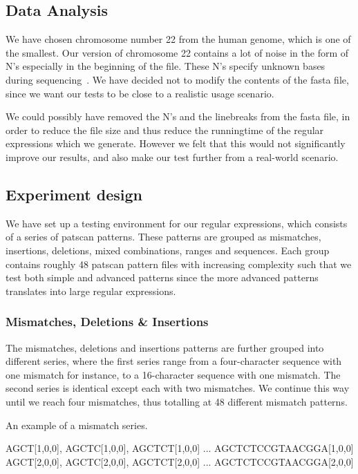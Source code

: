 \documentclass[12pt]{article}
\theoremstyle{definition}
\begin{document}
\subsection{Data Analysis}

We have chosen chromosome number 22 from the human genome, which is one of the smallest. Our version of chromosome 22 contains a lot of noise in the form of N's especially in the beginning of the file. These N's specify unknown bases during sequencing~\cite{human-genome}. We have decided not to modify the contents of the fasta file, since we want our tests to be close to a realistic usage scenario.

We could possibly have removed the N's and the linebreaks from the fasta file, in order to reduce the file size and thus reduce the runningtime of the regular expressions which we generate. However we felt that this would not significantly improve our results, and also make our test further from a real-world scenario.

\subsection{Experiment design}

We have set up a testing environment for our regular expressions, which consists of a series of patscan patterns. These patterns are grouped as mismatches, insertions, deletions, mixed combinations, ranges and sequences. Each group contains roughly 48 patscan pattern files with increasing complexity such that we test both simple and advanced patterns since the more advanced patterns translates into large regular expressions. 

\subsubsection{Mismatches, Deletions \& Insertions}
The mismatches, deletions and insertions patterns are further grouped into different series, where the first series range from a four-character sequence with one mismatch for instance, to a 16-character sequence with one mismatch. The second series is identical except each with two mismatches. We continue this way until we reach four mismatches, thus totalling at 48 different mismatch patterns.

\begin{example}
An example of a mismatch series.

\begin{center}
AGCT[1,0,0], AGCTC[1,0,0], AGCTCT[1,0,0] ... AGCTCTCCGTAACGGA[1,0,0]\\
AGCT[2,0,0], AGCTC[2,0,0], AGCTCT[2,0,0] ... AGCTCTCCGTAACGGA[2,0,0]
\end{center}
\end{example}
\end{document}

